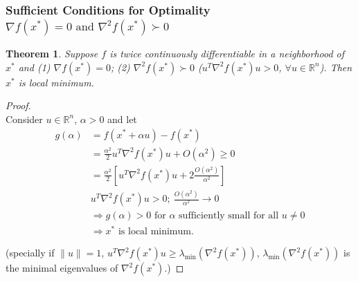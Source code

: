 \documentclass[11pt,a4paper]{article}
\newtheorem{theorem}{Theorem}
\begin{document}
\subsubsection{Sufficient Conditions for Optimality $\nabla f(x^*)=0\text{ and }\nabla^2 f(x^*)\succ 0$}
\begin{theorem}
Suppose $f$ is twice continuously differentiable in a neighborhood of $x^*$ and
(1) $\nabla f(x^*)=0$; (2) $\nabla^2 f(x^*)\succ 0$ ($u^T\nabla^2 f(x^*) u>0$, $\forall u\in \mathbb{R}^n$).
Then $x^*$ is local minimum.
\end{theorem}
\begin{proof}
\quad\\
Consider $u\in \mathbb{R}^n$, $\alpha>0$ and let
\begin{equation}
    \begin{aligned}
        g(\alpha)&=f(x^*+\alpha u)-f(x^*)\\
        &=\frac{\alpha^2}{2}u^T\nabla^2 f(x^*) u+O(\alpha^2)\geq 0\\
        &=\frac{\alpha^2}{2}[u^T\nabla^2 f(x^*) u+2\frac{O(\alpha^2)}{\alpha^2}]\\
        &u^T\nabla^2 f(x^*) u>0;\ \frac{O(\alpha^2)}{\alpha^2}\rightarrow 0\\
        &\Rightarrow g(\alpha)>0\text{ for }\alpha\text{ sufficiently small for all }u\neq 0\\
        &\Rightarrow x^*\text{ is local minimum}.
    \end{aligned}
    \nonumber
\end{equation}

(specially if $\|u\|=1$, $u^T\nabla^2 f(x^*) u\geq \lambda_{\min}(\nabla^2 f(x^*))$, $\lambda_{\min}(\nabla^2 f(x^*))$ is the minimal eigenvalues of $\nabla^2 f(x^*)$.)
\end{proof}
\end{document}
